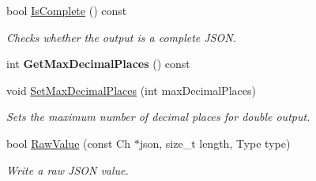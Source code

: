 \begin{DoxyCompactItemize}
bool \hyperlink{classWriter_a3afe8548b06b9f9601f59fbc0687c79b}{Is\+Complete} () const
\begin{DoxyCompactList}\small\item\em Checks whether the output is a complete J\+S\+ON. \end{DoxyCompactList}\item 
\mbox{\label{classWriter_aefe66230ff65fba439d7df7b14d49f89}} 
int {\bfseries Get\+Max\+Decimal\+Places} () const
\item 
void \hyperlink{classWriter_adc08c69c399172cdf3dee9e5548c908f}{Set\+Max\+Decimal\+Places} (int max\+Decimal\+Places)
\begin{DoxyCompactList}\small\item\em Sets the maximum number of decimal places for double output. \end{DoxyCompactList}\item 
bool \hyperlink{classWriter_a35e496982fdbdc7f5d9d29775656cd38}{Raw\+Value} (const Ch $\ast$json, size\+\_\+t length, Type type)
\begin{DoxyCompactList}\small\item\em Write a raw J\+S\+ON value. \end{DoxyCompactList}\end{DoxyCompactItemize}
